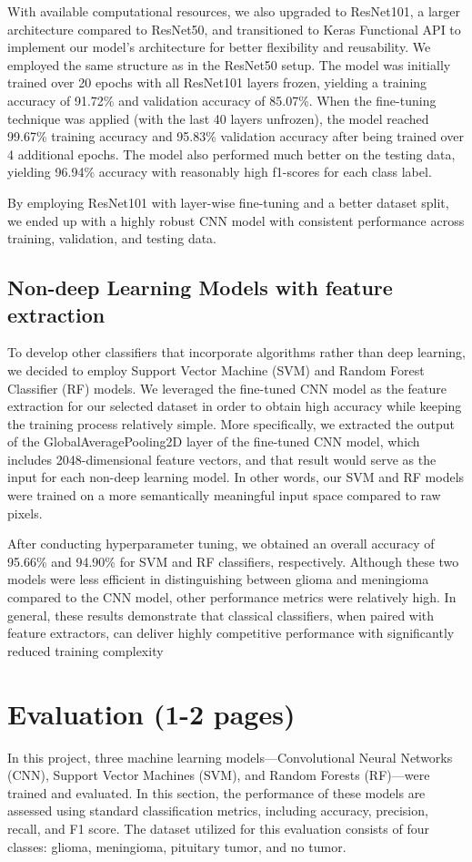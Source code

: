 \documentclass[conference]{IEEEtran}
\begin{document}
With available computational resources, we also upgraded to ResNet101, a larger architecture compared to ResNet50, 
and transitioned to Keras Functional API to implement our model’s architecture for better flexibility and reusability. 
We employed the same structure as in the ResNet50 setup. The model was initially trained over 20 epochs with all ResNet101 layers frozen, yielding a training accuracy of 91.72\% and validation accuracy of 85.07\%. 
When the fine-tuning technique was applied (with the last 40 layers unfrozen), the model reached 99.67\% training accuracy and 95.83\% validation accuracy after being trained over 4 additional epochs. 
The model also performed much better on the testing data, yielding 96.94\% accuracy with reasonably high f1-scores for each class label. \

By employing ResNet101 with layer-wise fine-tuning and a better dataset split, 
we ended up with a highly robust CNN model with consistent performance across training, validation, and testing data.

\subsection{\large Non-deep Learning Models with feature extraction}
To develop other classifiers that incorporate algorithms rather than deep learning, we decided to employ Support Vector Machine (SVM) and Random Forest Classifier (RF) models. 
We leveraged the fine-tuned CNN model as the feature extraction for our selected dataset in order to obtain high accuracy while keeping the training process relatively simple. 
More specifically, we extracted the output of the GlobalAveragePooling2D layer of the fine-tuned CNN model, which includes 2048-dimensional feature vectors, and that result would serve as the input for each non-deep learning model. 
In other words, our SVM and RF models were trained on a more semantically meaningful input space compared to raw pixels. \

After conducting hyperparameter tuning, we obtained an overall accuracy of 95.66\% and 94.90\% for SVM and RF classifiers, respectively. 
Although these two models were less efficient in distinguishing between glioma and meningioma compared to the CNN model, 
other performance metrics were relatively high. In general, these results demonstrate that classical classifiers, when paired with feature extractors, can deliver highly competitive performance with significantly reduced training complexity

\section{\large Evaluation (1-2 pages)}
In this project, three machine learning models—Convolutional Neural Networks (CNN), Support Vector Machines (SVM), and Random Forests (RF)—were trained and evaluated. In this section, the performance of these models are assessed using standard classification metrics, including accuracy, precision, recall, and F1 score. The dataset utilized for this evaluation consists of four classes: glioma, meningioma, pituitary tumor, and no tumor.
\end{document}
